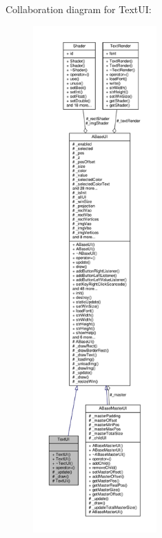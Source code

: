 Collaboration diagram for Text\+UI\+:
\nopagebreak
\begin{figure}[H]
\begin{center}
\leavevmode
\includegraphics[height=550pt]{class_text_u_i__coll__graph}
\end{center}
\end{figure}
